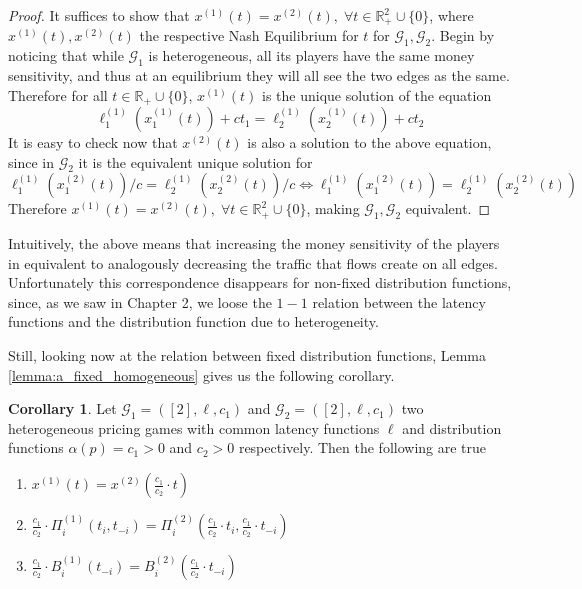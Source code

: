 \documentclass[10pt,a4paper]{book}
\newcommand{\R}{\mathbb{R}}
\newcommand{\Gm}{\mathcal{G}}
\theoremstyle{definition}
\newtheorem{corollary}[definition]{Corollary}
\theoremstyle{comment}
\begin{document}
\begin{proof}
	It suffices to show that $x^{(1)}(t) = x^{(2)}(t), \; \forall t \in \R_+^2 \cup \{0\}$, where $x^{(1)}(t), x^{(2)}(t)$ the respective Nash Equilibrium for $t$ for $\Gm_1, \Gm_2$.
	Begin by noticing that while $\Gm_1$ is heterogeneous, all its players have the same money sensitivity, and thus at an equilibrium they will all see the two edges as the same.
	Therefore for all $t \in \R_+ \cup \{0\}$, $x^{(1)}(t)$ is the unique solution of the equation
	\[
		\ell_1^{(1)}(x_1^{(1)}(t)) + ct_1 = \ell_2^{(1)}(x_2^{(1)}(t)) + ct_2
	\]
	It is easy to check now that $x^{(2)}(t)$ is also a solution to the above equation, since in $\Gm_2$ it is the equivalent unique solution for
	\[
		\ell_1^{(1)}(x_1^{(2)}(t)) / c = \ell_2^{(1)}(x_2^{(2)}(t)) / c \Leftrightarrow \ell_1^{(1)}(x_1^{(2)}(t)) = \ell_2^{(1)}(x_2^{(2)}(t)) 
	\]
	Therefore $x^{(1)}(t) = x^{(2)}(t), \; \forall t \in \R_+^2 \cup \{0\}$, making $\Gm_1, \Gm_2$ equivalent.
\end{proof}
Intuitively, the above means that increasing the money sensitivity of the players in equivalent to analogously decreasing the traffic that flows create on all edges.
Unfortunately this correspondence  disappears for non-fixed distribution functions, since, as we saw in Chapter 2, we loose the $1-1$ relation between the latency functions and the distribution function due to heterogeneity.

Still, looking now at the relation between fixed distribution functions, Lemma \ref{lemma:a_fixed_homogeneous} gives us the following corollary.
\begin{corollary}
	\label{corollary:a_fixed_c_relation}
	Let $\Gm_1 = ([2], \ell, c_1)$ and $\Gm_2 = ([2], \ell, c_1)$ two heterogeneous pricing games with common latency functions $\ell$ and distribution functions $\alpha(p) = c_1 > 0$ and $c_2 > 0$ respectively.
	Then the following are true
	\begin{enumerate}[$(i)$]
		\item $x^{(1)}(t) = x^{(2)}\left(\frac{c_1}{c_2} \cdot t\right)$
		\item $\frac{c_1}{c_2} \cdot \Pi_i^{(1)}(t_i, t_{-i}) = \Pi_i^{(2)}\left(\frac{c_1}{c_2} \cdot t_i, \frac{c_1}{c_2} \cdot t_{-i}\right)$
		\item $\frac{c_1}{c_2} \cdot B_i^{(1)}(t_{-i}) = B_i^{(2)}\left(\frac{c_1}{c_2} \cdot t_{-i}\right)$
	\end{enumerate}
\end{corollary}
\end{document}
